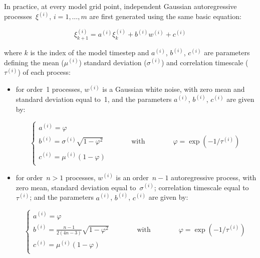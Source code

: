 \documentclass[../tex_main/NEMO_manual]{subfiles}
\begin{document}
In practice, at every model grid point,
independent Gaussian autoregressive processes~$\xi^{(i)},\,i=1,\ldots,m$ are first generated using
the same basic equation:

\begin{equation}
\label{eq:autoreg}
\xi^{(i)}_{k+1} = a^{(i)} \xi^{(i)}_k + b^{(i)} w^{(i)} + c^{(i)}
\end{equation}

\noindent
where $k$ is the index of the model timestep and
$a^{(i)}$, $b^{(i)}$, $c^{(i)}$ are parameters defining the mean ($\mu^{(i)}$) standard deviation ($\sigma^{(i)}$) and
correlation timescale ($\tau^{(i)}$) of each process:

\begin{itemize}
\item
  for order~1 processes, $w^{(i)}$ is a Gaussian white noise, with zero mean and standard deviation equal to~1,
  and the parameters $a^{(i)}$, $b^{(i)}$, $c^{(i)}$ are given by:

\begin{equation}
\label{eq:ord1}
\left\{
\begin{array}{l}
a^{(i)} = \varphi \\
b^{(i)} = \sigma^{(i)} \sqrt{ 1 - \varphi^2 } 
 \qquad\qquad\mbox{with}\qquad\qquad
\varphi = \exp \left( - 1 / \tau^{(i)} \right) \\
c^{(i)} = \mu^{(i)} \left( 1 - \varphi \right) \\
\end{array}
\right.
\end{equation}

\item
  for order~$n>1$ processes, $w^{(i)}$ is an order~$n-1$ autoregressive process, with zero mean,
  standard deviation equal to~$\sigma^{(i)}$;
  correlation timescale equal to~$\tau^{(i)}$;
  and the parameters $a^{(i)}$, $b^{(i)}$, $c^{(i)}$ are given by:

\begin{equation}
\label{eq:ord2}
\left\{
\begin{array}{l}
a^{(i)} = \varphi \\
b^{(i)} = \frac{n-1}{2(4n-3)} \sqrt{ 1 - \varphi^2 } 
 \qquad\qquad\mbox{with}\qquad\qquad
\varphi = \exp \left( - 1 / \tau^{(i)} \right) \\
c^{(i)} = \mu^{(i)} \left( 1 - \varphi \right) \\
\end{array}
\right.
\end{equation}

\end{itemize}
\end{document}
